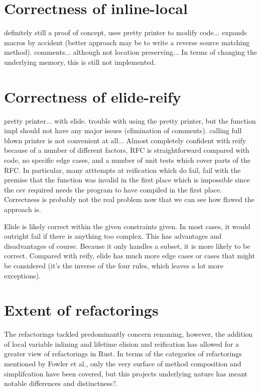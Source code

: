 \section{Correctness of inline-local}
definitely still a proof of concept, uses pretty printer to modify code... expands macros by accident (better approach may be to write a reverse source matching method). comments... although not location preserving... In terms of changing the underlying memory, this is still not implemented. 

\section{Correctness of elide-reify}
pretty printer... with elide. trouble with using the pretty printer, but the function impl should not have any major issues (elimination of comments). calling full blown printer is not convenient at all...
Almost completely confident with reify because of a number of different factors, RFC is straightforward compared with code, no specific edge cases, and a number of unit tests which cover parts of the RFC. In particular, many atttempts at reification which do fail, fail with the premise that the function was invalid in the first place which is impossible since the csv required needs the program to have compiled in the first place. Correctness is probably not the real problem now that we can see how flawed the approach is.

Elide is likely correct within the given constraints given. In most cases, it would outright fail if there is anything too complex. This has advantages and disadvantages of course. Because it only handles a subset, it is more likely to be correct. Compared with reify, elide has much more edge cases or cases that might be considered (it's the inverse of the four rules, which leaves a lot more exceptions).

\section{Extent of refactorings}

The refactorings tackled predominantly concern renaming, however, the addition of local variable inlining and lifetime elision and reification has allowed for a greater view of refactorings in Rust. In terms of the categories of refactorings mentioned by Fowler et al., only the very surface of method composition and simplifcation have been covered, but this projects underlying nature has meant notable differences and distinctness?. 


